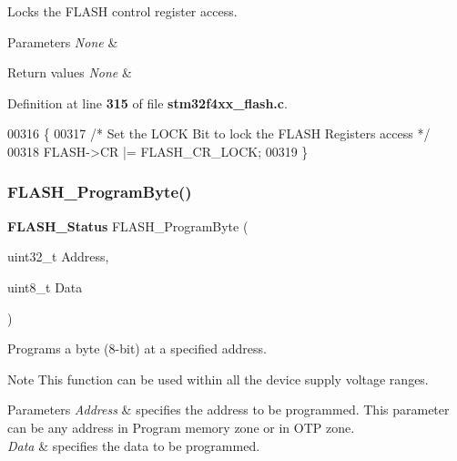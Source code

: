 Locks the F\+L\+A\+SH control register access. 


\begin{DoxyParams}{Parameters}
{\em None} & \\
\hline
\end{DoxyParams}

\begin{DoxyRetVals}{Return values}
{\em None} & \\
\hline
\end{DoxyRetVals}


Definition at line \textbf{ 315} of file \textbf{ stm32f4xx\+\_\+flash.\+c}.


\begin{DoxyCode}
00316 \{
00317   \textcolor{comment}{/* Set the LOCK Bit to lock the FLASH Registers access */}
00318   FLASH->CR |= FLASH_CR_LOCK;
00319 \}
\end{DoxyCode}
\mbox{\label{group__FLASH__Group2_gac425adf52fe7f229ef6bb893fe386848}} 
\subsubsection{F\+L\+A\+S\+H\+\_\+\+Program\+Byte()}
{\footnotesize\ttfamily \textbf{ F\+L\+A\+S\+H\+\_\+\+Status} F\+L\+A\+S\+H\+\_\+\+Program\+Byte (\begin{DoxyParamCaption}\item[{uint32\+\_\+t}]{Address,  }\item[{uint8\+\_\+t}]{Data }\end{DoxyParamCaption})}



Programs a byte (8-\/bit) at a specified address. 

\begin{DoxyNote}{Note}
This function can be used within all the device supply voltage ranges. 
\end{DoxyNote}

\begin{DoxyParams}{Parameters}
{\em Address} & specifies the address to be programmed. This parameter can be any address in Program memory zone or in O\+TP zone. \\
\hline
{\em Data} & specifies the data to be programmed. \\
\hline
\end{DoxyParams}

